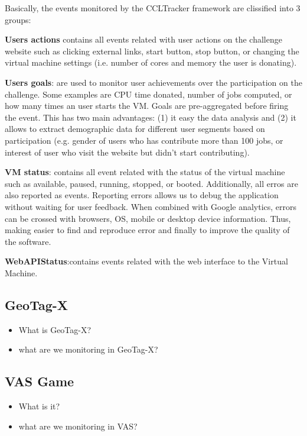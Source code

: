 \documentclass{article}
\begin{document}
Basically, the events monitored by the CCLTracker framework are clissified into 3 groups:

\textbf{Users actions} contains all events related with user actions on the challenge website such as clicking external links, start button,  stop button, or changing the  virtual machine settings (i.e. number of cores and memory the user is donating). 

\textbf{Users goals}: are used to monitor user achievements over the participation on the challenge. Some examples are CPU time donated, number of jobs computed, or how many times an user starts the VM. Goals are pre-aggregated before firing the event. This has two main advantages: (1) it easy the data analysis and (2) it allows to extract demographic data for different user segments based on participation (e.g. gender of users who has contribute more than 100 jobs, or interest of user who visit the website but didn't start contributing). 

\textbf{VM status}: contains all event related with the status of the virtual machine such as available, paused, running, stopped, or booted. Additionally, all erros are also reported as events. Reporting errors allows us to debug the application without waiting for user feedback. When combined with Google analytics, errors can be crossed with browsers, OS, mobile or desktop device information. Thus, making easier to find and reproduce error and finally to improve the quality of the software. 

\textbf{WebAPIStatus}:contains events related with the web interface to the Virtual Machine.



\subsection{GeoTag-X}
\begin{itemize}
\item What is GeoTag-X?
\item what are we monitoring in GeoTag-X?
\end{itemize}


\subsection{VAS Game}
\begin{itemize}
\item What is it?
\item what are we monitoring in VAS?
\end{itemize}
\end{document}
